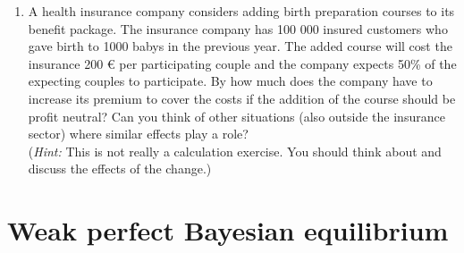 \documentclass[a4paper,12pt]{article}
\begin{document}
\begin{enumerate}[resume]
  \item A health insurance company considers adding birth preparation courses to its benefit package. The insurance company has 100 000 insured customers who gave birth to 1000 babys in the previous year. The added course will cost the insurance 200 € per participating couple and the company expects  50\% of the expecting couples to participate. By how much does the company have to increase its premium to cover the costs if the addition of the course should be profit neutral? Can you think of other situations (also outside the insurance sector) where similar effects play a role?\\
    (\emph{Hint:} This is not really a calculation exercise. You should think about and discuss the effects of the change.)
\end{enumerate}

\section{Weak perfect Bayesian equilibrium}
\label{sec:weak-perf-bayes}
\end{document}

